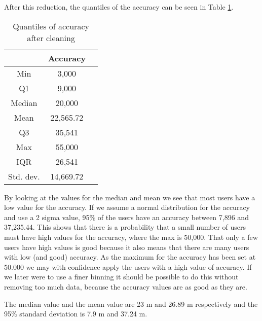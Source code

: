 After this reduction, the quantiles of the accuracy can be seen in Table \ref{tab:acc_quantiles}. 
 \begin{table}[htbp]
        \centering
        \small
        \setlength\tabcolsep{2pt}
        \begin{tabular}{|c|c|c|}
            \hline
                         & Accuracy      \\[0pt]
            \hline
                 Min     &  3,000       \\
            \hline
                 Q1      &  9,000   \\
            \hline
                 Median  &  20,000    \\
            \hline
                 Mean    &  22,565.72    \\
            \hline
                 Q3      &  35,541      \\
            \hline
                 Max &  55,000   \\
            \hline
                 IQR     &   26,541     \\
            \hline
                Std. dev.  &  14,669.72   \\
            \hline
        \end{tabular}
        \caption{Quantiles of accuracy after cleaning} %
        \label{tab:acc_quantiles}
\end{table}

By looking at the values for the median and mean we see that most users have a low value for the accuracy. If we assume a normal distribution for the accuracy and use a 2 sigma value, 95\% of the users have an accuracy between 7,896 and 37,235.44. This shows that there is a probability that a small number of users must have high values for the accuracy, where the max is 50,000. That only a few users have high values is good because it also means that there are many users with low (and good) accuracy. As the maximum for the accuracy has been set at 50.000 we may with confidence apply the users with a high value of accuracy. If we later were to use a finer binning it should be possible to do this without removing too much data, because the accuracy values are as good as they are.   

The median value and the mean value are 23 m and 26.89 m respectively and the 95\% standard deviation is 7.9 m and 37.24 m. 


